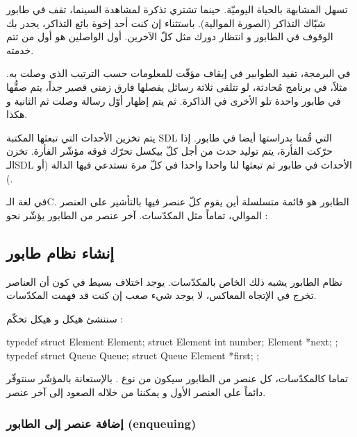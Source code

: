 تسهل المشابهة بالحياة اليوميّة. حينما تشتري تذكرة لمشاهدة السينما، تقف في طابور شبّاك التذاكر (الصورة الموالية). باستثناء إن كنت أحد إخوة بائع التذاكر، يجدر بك الوقوف في الطابور و انتظار دورك مثل كلّ الآخرين. أول الواصلين هو أول من تتم خدمته.


 في البرمجة، تفيد الطوابير في إيقاف مؤقّت للمعلومات حسب الترتيب الذي وصلت به. مثلاً، في برنامج مُحادثة، لو تتلقى ثلاثة رسائل يفصلها فارق زمني قصير جداً، يتم صفُّها في طابور واحدة تلو الأخرى في الذاكرة. ثم يتم إظهار أوّل رسالة وصلت ثم الثانية و هكذا.
 
يتم تخزين الأحداث التي تبعثها المكتبة
\textenglish{SDL}
التي قُمنا بدراستها أيضا في طابور. إذا حرّكت الفأرة، يتم توليد حدث من أجل كلّ بيكسل تحرّك فوقه مؤشّر الفأرة. تخزن الـ\textenglish{SDL}
الأحداث في طابور ثم تبعثها لنا واحدا واحدا في كلّ مرة نستدعي فيها الدالة
(أو
).

في لغة الـ\textenglish{C}.
الطابور هو قائمة متسلسلة أين يقوم كلّ عنصر فيها بالتأشير على العنصر الموالي، تماماً مثل المكدّسات. آخر عنصر من الطابور يؤشّر نحو
 :


\subsection{إنشاء نظام طابور}

نظام الطابور يشبه ذلك الخاص بالمكدّسات. يوجد اختلاف بسيط في كون أن العناصر تخرج في الإتجاه المعاكس، لا يوجد شيء صعب إن كنت قد فهمت المكدّسات.

سننشئ هيكل
و هيكل تحكّم
 :

\begin{Csource}
typedef struct Element Element;
struct Element
{
	int number;
	Element *next;
};
typedef struct Queue Queue;
struct Queue
{
	Element *first;
};
\end{Csource}

تماما كالمكدّسات، كل عنصر من الطابور سيكون من نوع
.
بالإستعانة بالمؤشّر 
سنتوفّر دائماً على العنصر الأول و يمكننا من خلاله الصعود إلى آخر عنصر.

\subsubsection{إضافة عنصر إلى الطابور (\textenglish{enqueuing})}

